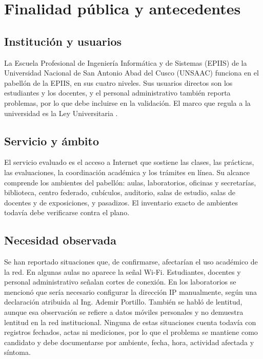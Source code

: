 \section{Finalidad pública y antecedentes}

\subsection{Institución y usuarios}

	La Escuela Profesional de Ingeniería Informática y de Sistemas (EPIIS) de la Universidad Nacional de San Antonio Abad del Cusco (UNSAAC) funciona en el pabellón de la EPIIS, en sus cuatro niveles. Sus usuarios directos son los estudiantes y los docentes, y el personal administrativo también reporta problemas, por lo que debe incluirse en la validación. El marco que regula a la universidad es la Ley Universitaria \cite{leyuniversitaria}.

\subsection{Servicio y ámbito}

	El servicio evaluado es el acceso a Internet que sostiene las clases, las prácticas, las evaluaciones, la coordinación académica y los trámites en línea. Su alcance comprende los ambientes del pabellón: aulas, laboratorios, oficinas y secretarías, biblioteca, centro federado, cubículos, auditorio, salas de estudio, salas de docentes y de exposiciones, y pasadizos. El inventario exacto de ambientes todavía debe verificarse contra el plano.

\subsection{Necesidad observada}

	Se han reportado situaciones que, de confirmarse, afectarían el uso académico de la red. En algunas aulas no aparece la señal Wi-Fi. Estudiantes, docentes y personal administrativo señalan cortes de conexión. En los laboratorios se mencionó que sería necesario configurar la dirección IP manualmente, según una declaración atribuida al Ing. Ademir Portillo. También se habló de lentitud, aunque esa observación se refiere a datos móviles personales y no demuestra lentitud en la red institucional. Ninguna de estas situaciones cuenta todavía con registros fechados, actas ni mediciones, por lo que el problema se mantiene como candidato y debe documentarse por ambiente, fecha, hora, actividad afectada y síntoma.

